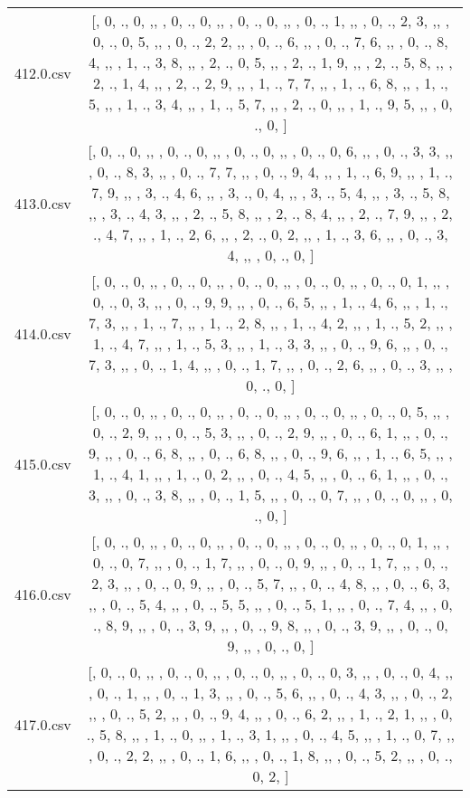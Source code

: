 \begin{table}[ht]
\begin{tabular}{@{}c c@{}}
	412.0.csv & [, 0, ., 0, ,,  , 0, ., 0, ,,  , 0, ., 0, ,,  , 0, ., 1, ,,  , 0, ., 2, 3, ,,  , 0, ., 0, 5, ,,  , 0, ., 2, 2, ,,  , 0, ., 6, ,,  , 0, ., 7, 6, ,,  , 0, ., 8, 4, ,,  , 1, ., 3, 8, ,,  , 2, ., 0, 5, ,,  , 2, ., 1, 9, ,,  , 2, ., 5, 8, ,,  , 2, ., 1, 4, ,,  , 2, ., 2, 9, ,,  , 1, ., 7, 7, ,,  , 1, ., 6, 8, ,,  , 1, ., 5, ,,  , 1, ., 3, 4, ,,  , 1, ., 5, 7, ,,  , 2, ., 0, ,,  , 1, ., 9, 5, ,,  , 0, ., 0, ]\\ 
	413.0.csv & [, 0, ., 0, ,,  , 0, ., 0, ,,  , 0, ., 0, ,,  , 0, ., 0, 6, ,,  , 0, ., 3, 3, ,,  , 0, ., 8, 3, ,,  , 0, ., 7, 7, ,,  , 0, ., 9, 4, ,,  , 1, ., 6, 9, ,,  , 1, ., 7, 9, ,,  , 3, ., 4, 6, ,,  , 3, ., 0, 4, ,,  , 3, ., 5, 4, ,,  , 3, ., 5, 8, ,,  , 3, ., 4, 3, ,,  , 2, ., 5, 8, ,,  , 2, ., 8, 4, ,,  , 2, ., 7, 9, ,,  , 2, ., 4, 7, ,,  , 1, ., 2, 6, ,,  , 2, ., 0, 2, ,,  , 1, ., 3, 6, ,,  , 0, ., 3, 4, ,,  , 0, ., 0, ]\\ 
	414.0.csv & [, 0, ., 0, ,,  , 0, ., 0, ,,  , 0, ., 0, ,,  , 0, ., 0, ,,  , 0, ., 0, 1, ,,  , 0, ., 0, 3, ,,  , 0, ., 9, 9, ,,  , 0, ., 6, 5, ,,  , 1, ., 4, 6, ,,  , 1, ., 7, 3, ,,  , 1, ., 7, ,,  , 1, ., 2, 8, ,,  , 1, ., 4, 2, ,,  , 1, ., 5, 2, ,,  , 1, ., 4, 7, ,,  , 1, ., 5, 3, ,,  , 1, ., 3, 3, ,,  , 0, ., 9, 6, ,,  , 0, ., 7, 3, ,,  , 0, ., 1, 4, ,,  , 0, ., 1, 7, ,,  , 0, ., 2, 6, ,,  , 0, ., 3, ,,  , 0, ., 0, ]\\ 
	415.0.csv & [, 0, ., 0, ,,  , 0, ., 0, ,,  , 0, ., 0, ,,  , 0, ., 0, ,,  , 0, ., 0, 5, ,,  , 0, ., 2, 9, ,,  , 0, ., 5, 3, ,,  , 0, ., 2, 9, ,,  , 0, ., 6, 1, ,,  , 0, ., 9, ,,  , 0, ., 6, 8, ,,  , 0, ., 6, 8, ,,  , 0, ., 9, 6, ,,  , 1, ., 6, 5, ,,  , 1, ., 4, 1, ,,  , 1, ., 0, 2, ,,  , 0, ., 4, 5, ,,  , 0, ., 6, 1, ,,  , 0, ., 3, ,,  , 0, ., 3, 8, ,,  , 0, ., 1, 5, ,,  , 0, ., 0, 7, ,,  , 0, ., 0, ,,  , 0, ., 0, ]\\ 
	416.0.csv & [, 0, ., 0, ,,  , 0, ., 0, ,,  , 0, ., 0, ,,  , 0, ., 0, ,,  , 0, ., 0, 1, ,,  , 0, ., 0, 7, ,,  , 0, ., 1, 7, ,,  , 0, ., 0, 9, ,,  , 0, ., 1, 7, ,,  , 0, ., 2, 3, ,,  , 0, ., 0, 9, ,,  , 0, ., 5, 7, ,,  , 0, ., 4, 8, ,,  , 0, ., 6, 3, ,,  , 0, ., 5, 4, ,,  , 0, ., 5, 5, ,,  , 0, ., 5, 1, ,,  , 0, ., 7, 4, ,,  , 0, ., 8, 9, ,,  , 0, ., 3, 9, ,,  , 0, ., 9, 8, ,,  , 0, ., 3, 9, ,,  , 0, ., 0, 9, ,,  , 0, ., 0, ]\\ 
	417.0.csv & [, 0, ., 0, ,,  , 0, ., 0, ,,  , 0, ., 0, ,,  , 0, ., 0, 3, ,,  , 0, ., 0, 4, ,,  , 0, ., 1, ,,  , 0, ., 1, 3, ,,  , 0, ., 5, 6, ,,  , 0, ., 4, 3, ,,  , 0, ., 2, ,,  , 0, ., 5, 2, ,,  , 0, ., 9, 4, ,,  , 0, ., 6, 2, ,,  , 1, ., 2, 1, ,,  , 0, ., 5, 8, ,,  , 1, ., 0, ,,  , 1, ., 3, 1, ,,  , 0, ., 4, 5, ,,  , 1, ., 0, 7, ,,  , 0, ., 2, 2, ,,  , 0, ., 1, 6, ,,  , 0, ., 1, 8, ,,  , 0, ., 5, 2, ,,  , 0, ., 0, 2, ]\\ 

\end{tabular}
\end{table}
